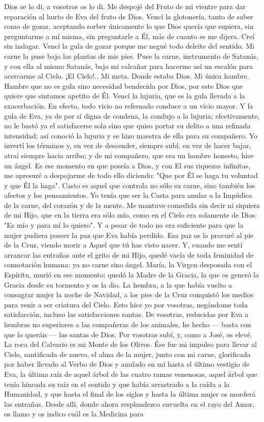\documentclass[12pt, twoside, openright]{book} %
\begin{document}
Dios se lo di, a vosotros os lo di. Me despojé del Fruto de mi vientre para dar reparación al hurto de Eva del fruto de Dios. Vencí la glotonería, tanto de saber como de gozar, aceptando sorber únicamente lo que Dios quería que supiera, sin preguntarme a mí misma, sin preguntarle a Él, más de cuanto se me dijera. Creí sin indagar. Vencí la gula de gozar porque me negué todo deleite del sentido. Mi carne la puse bajo las plantas de mis pies. Puse la carne, instrumento de Satanás, y con ella al mismo Satanás, bajo mi calcañar para hacerme así un escalón para acercarme al Cielo. ¡El Cielo!.. Mi meta. Donde estaba Dios. Mi única hambre. Hambre que no es gula sino necesidad bendecida por Dios, por este Dios que quiere que sintamos apetito de Él. Vencí la lujuria, que es la gula llevada a la exacerbación. En efecto, todo vicio no refrenado conduce a un vicio mayor. Y la gula de Eva, ya de por sí digna de condena, la condujo a la lujuria; efectivamente, no le bastó ya el satisfacerse sola sino que quiso portar su delito a una refinada intensidad; así conoció la lujuria y se hizo maestra de ella para su compañero. Yo invertí los términos y, en vez de descender, siempre subí; en vez de hacer bajar, atraí siempre hacia arriba; y de mi compañero, que era un hombre honesto, hice un ángel. Es ese momento en que poseía a Dios, y con El sus riquezas infinitas, me apresuré a despojarme de todo ello diciendo: "Que por Él se haga tu voluntad y que Él la haga". Casto es aquel que controla no sólo su carne, sino también los afectos y los pensamientos. Yo tenía que ser la Casta para anular a la Impúdica de la carne, del corazón y de la mente. Me mantuve comedida sin decir ni siquiera de mi Hijo, que en la tierra era sólo mío, como en el Cielo era solamente de Dios: "Es mío y para mí lo quiero". Y a pesar de todo no era suficiente para que la mujer pudiera poseer la paz que Eva había perdido. Esa paz os la procuré al pie de la Cruz, viendo morir a Aquel que tú has visto nacer. Y, cuando me sentí arrancar las entrañas ante el grito de mi Hijo, quedé vacía de toda feminidad de connotación humana: ya no carne sino ángel. María, la Virgen desposada con el Espíritu, murió en ese momento; quedó la Madre de la Gracia, la que os generó la Gracia desde su tormento y os la dio. La hembra, a la que había vuelto a consagrar mujer la noche de Navidad, a los pies de la Cruz conquistó los medios para venir a ser criatura del Cielo. Esto hice yo por vosotras, negándome toda satisfacción, incluso las satisfacciones santas. De vosotras, reducidas por Eva a hembras no superiores a las compañeras de los animales, he hecho — basta con que lo queráis — las santas de Dios. Por vosotras subí, y, como a José, os elevé. La roca del Calvario es mi Monte de los Olivos. Ése fue mi impulso para llevar al Cielo, santificada de nuevo, el alma de la mujer, junto con mi carne, glorificada por haber llevado al Verbo de Dios y anulado en mí hasta el último vestigio de Eva, la última raíz de aquel árbol de las cuatro ramas venenosas, aquel árbol que tenía hincada su raíz en el sentido y que había arrastrado a la caída a la Humanidad, y que hasta el final de los siglos y hasta la última mujer os morderá las entrañas. Desde allí, donde ahora resplandezco envuelta en el rayo del Amor, os llamo y os indico cuál es la Medicina para 
\end{document}
